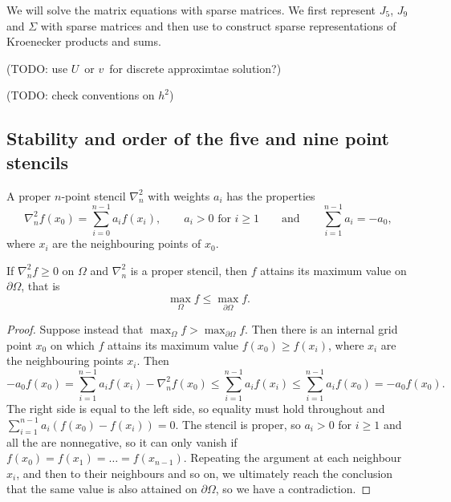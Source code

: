 We will solve the matrix equations with sparse matrices. \cite{scipy_sparse} 
We first represent $J_5$, $J_9$ and $\Sigma$ with sparse matrices and then use \cite{scipy_kron} to construct sparse representations of Kroenecker products and sums.

(TODO: use $U$ or $v$ for discrete approximtae solution?)

(TODO: check conventions on $h^2$)

\newcommand{\inorm}[1]{
\lVert #1 \rVert_\infty
}

\subsection{Stability and order of the five and nine point stencils}
\begin{definition}
  A proper $n$-point stencil $\nabla_n^2$ with weights $a_i$ has the properties
  \begin{equation*}
  	\nabla_n^2 f(x_0) = \sum_{i=0}^{n-1} a_i f(x_i),
	\qquad 
	a_i > 0 \,\, \text{for} \,\, i \geq 1
	\qquad \text{and} \qquad
	\sum_{i=1}^{n-1} a_i = -a_0,
  \end{equation*}
  where $x_i$ are the neighbouring points of $x_0$.
\end{definition}

\begin{lemma}\label{pde:lemma:max}
If $\nabla_n^2 f \geq 0$ on $\Omega$ and $\nabla_n^2$ is a proper stencil, then $f$ attains its maximum value on $\partial \Omega$, that is
$$
\max_\Omega f  \leq \max_{\partial \Omega} f.
$$
\end{lemma}
\begin{proof}
Suppose instead that $\max_\Omega f > \max_{\partial \Omega} f$.
Then there is an internal grid point $x_0$ on which $f$ attains its maximum value $f(x_0) \geq f(x_i)$, where $x_i$ are the neighbouring points $x_i$.
Then
\begin{equation}
  -a_0 f(x_0)
  = \sum_{i=1}^{n-1} a_i f(x_i) - \nabla_n^2 f(x_0)
  \leq \sum_{i=1}^{n-1} a_i f(x_i)
  \leq \sum_{i=1}^{n-1} a_i f(x_0)
  = -a_0 f(x_0).
\end{equation}
The right side is equal to the left side, so equality must hold throughout and $\sum_{i=1}^{n-1} a_i (f(x_0) - f(x_i)) = 0$.
The stencil is proper, so $a_i > 0$ for $i \geq 1$ and all the are nonnegative, so it can only vanish if $f(x_0) = f(x_1) = \dots = f(x_{n-1})$.
Repeating the argument at each neighbour $x_i$, and then to their neighbours and so on, we ultimately reach the conclusion that the same value is also attained on $\partial \Omega$, so we have a contradiction.
\end{proof}

